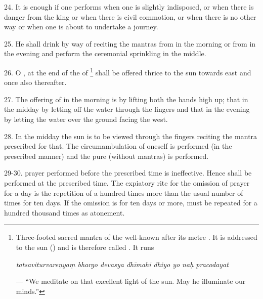 24. It is enough if one performs  when one is slightly
indisposed, or when there is danger from the king or when there is civil
commotion, or when there is no other way or when one is about to undertake
a journey.

25. He shall drink by way of  reciting the mantras from
 in the morning or from  in the evening and
perform the ceremonial sprinkling in the middle.

26. O , at the end of the  of 
\footnote{Three-footed sacred mantra of the  well-known after its
metre . It is addressed to the sun () and is therefore
called . It runs

\begin{shloka}\itshape
tatsaviturvareṇyaṃ bhargo devasya dhīmahi dhiyo yo naḥ pracodayat
\end{shloka}

— “We meditate on that excellent light of the sun. May he illuminate our minds.”}
 shall be offered thrice to the sun towards east and once also
thereafter.

27. The offering of  in the morning is by lifting both the hands high
up; that in the midday by letting off the water through the fingers and that in
the evening by letting the water over the ground facing the west.

28. In the midday the sun is to be viewed through the fingers reciting
the mantra prescribed for that. The circumambulation of oneself is performed (in
the prescribed manner) and the pure  (without mantras) is performed.

29-30.  prayer performed before the prescribed time is ineffective.
Hence  shall be performed at the prescribed time. The expiatory rite
for the omission of  prayer for a day is the repetition of
 a hundred times more than the usual number of times for ten days.
If the omission is for ten days or more,  must be repeated for
a hundred thousand times as atonement.

